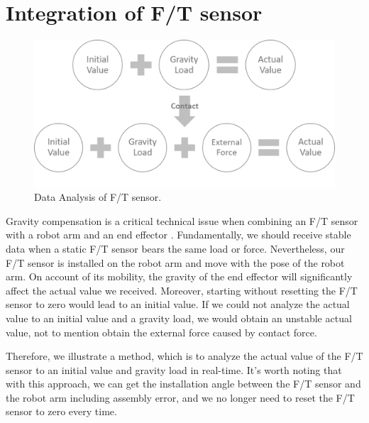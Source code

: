 \section{Integration of F/T sensor}
\label{sec:grav compen}
\begin{figure}[htbp]
\begin{center}
\includegraphics[width=1\linewidth]{Images/gravity compensation.png}
\caption{
Data Analysis of F/T sensor.
}\label{fig:gravity compensation}
\end{center}
\end{figure}
Gravity compensation is a critical technical issue when combining an F/T sensor with a robot arm and an end effector \cite{8997006}. 
Fundamentally, we should receive stable data when a static F/T sensor bears the same load or force. Nevertheless, our F/T sensor is installed on the robot arm and move with the pose of the robot arm. On account of its mobility, the gravity of the end effector will significantly affect the actual value we received. Moreover, starting without resetting the F/T sensor to zero would lead to an initial value. If we could not analyze the actual value to an initial value and a gravity load, we would obtain an unstable actual value, not to mention obtain the external force caused by contact force.
\par
Therefore, we illustrate a method, which is to analyze the actual value of the F/T sensor to an initial value and gravity load in real-time. It's worth noting that with this approach, we can get the installation angle between the F/T sensor and the robot arm including assembly error, and we no longer need to reset the F/T sensor to zero every time.
